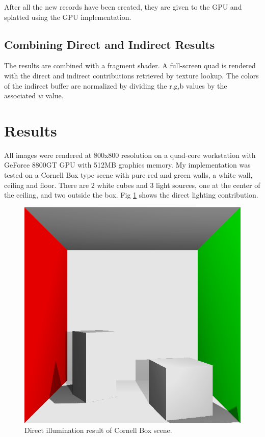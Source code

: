 \documentclass[10pt,twopage]{acmsiggraph}
\begin{document}
After all the new records have been created, they are given to the GPU and splatted using the GPU implementation.

\subsection{Combining Direct and Indirect Results}
The results are combined with a fragment shader.  A full-screen quad is rendered with the direct and indirect contributions retrieved by texture lookup.  The colors of the indirect buffer are normalized by dividing the r,g,b values by the associated $w$ value.

\section{Results}
All images were rendered at 800x800 resolution on a quad-core workstation with GeForce 8800GT GPU with 512MB graphics memory.  My implementation was tested on a Cornell Box type scene with pure red and green walls, a white wall, ceiling and floor.  There are 2 white cubes and 3 light sources, one at the center of the ceiling, and two outside the box.  Fig \ref{direct} shows the direct lighting contribution.

\begin{figure}[htbp]
\begin{center}
\includegraphics[scale = .3]{directIllumination.png}
\caption{Direct illumination result of Cornell Box scene.}
\label{direct}
\end{center}
\end{figure}
\end{document}
